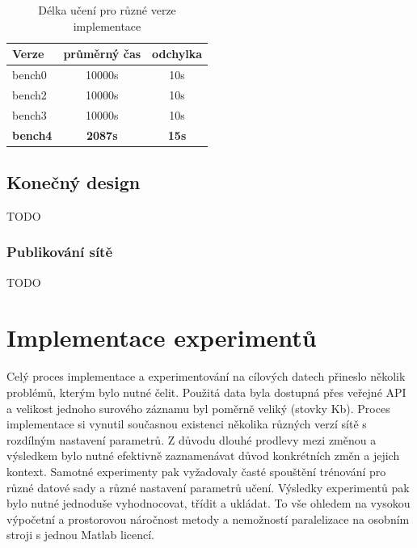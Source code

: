 \documentclass[thesis=M,czech]{FITthesis}[2012/06/26]
\begin{document}
\begin{table}[]
\centering
\caption{Délka učení pro různé verze implementace}
\label{my-measurel}
    \begin{tabular}{|l|c|c|}
        \hline
        Verze                         & \multicolumn{1}{l|}{průměrný čas} & \multicolumn{1}{l|}{odchylka} \\ \hline
        bench0                        & 10000s                                           & 10s                                    \\ \hline
        bench2                        & 10000s                                           & 10s                                    \\ \hline
        bench3                        & 10000s                                          & 10s                                    \\ \hline
        \textbf{bench4}               & \textbf{2087s}                                    & \textbf{15s}                           \\ \hline
    \end{tabular}
\end{table}


\subsection{Konečný design}
TODO

\subsubsection{Publikování sítě}
TODO

\section{Implementace experimentů}

Celý proces implementace a experimentování na cílových datech přineslo několik problémů, kterým bylo nutné čelit. 
Použitá data byla dostupná přes veřejné API a velikost jednoho surového záznamu byl poměrně veliký (stovky Kb).
Proces implementace si vynutil současnou existenci několika různých verzí sítě s rozdílným nastavení  parametrů. Z důvodu dlouhé prodlevy mezi změnou a výsledkem bylo nutné efektivně zaznamenávat důvod konkrétních změn a jejich kontext.
Samotné experimenty pak vyžadovaly časté spouštění trénování pro různé datové sady a různé nastavení parametrů učení. Výsledky experimentů pak bylo nutné jednoduše vyhodnocovat, třídit a ukládat. To vše ohledem na vysokou výpočetní a prostorovou náročnost metody a nemožností paralelizace na osobním stroji s jednou Matlab licencí. 
\end{document}
